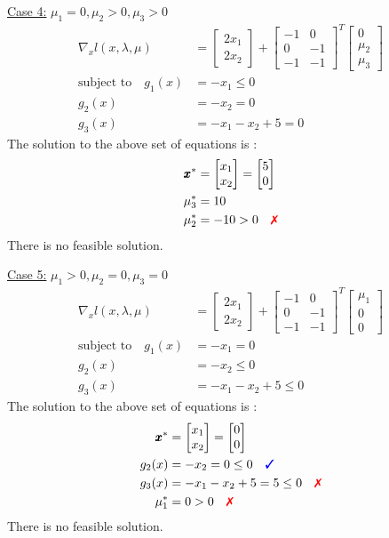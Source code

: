 \documentclass[a4paper,11pt]{article}
\newcommand{\V}[1]{\pmb{#1}}
\newcommand{\mat}[1]{\begin{bmatrix}#1\end{bmatrix}}
\newcommand{\cmark}{{\color{blue}\text{\ding{51}}}}%
\newcommand{\xmark}{{\color{red}\text{\ding{55}}}}%
\begin{document}
\noindent\underline{Case 4:} $\mu_1=0, \mu_2>0, \mu_3>0$
\begin{align*}
 \nabla_x l(x,\lambda,\mu) &= \mat{2x_1\\ 2x_2} +
\mat{-1& 0\\ 0& -1\\-1& -1}^T\mat{0\\ \mu_2\\ \mu_3}\\
% 
 \text{subject to}\quad g_1(x)&=-x_1 \leq 0\\
 g_2(x)&=-x_2 = 0\\
 g_3(x)&= -x_1 -x_2 +5 =0 
\end{align*}
The solution to the above set of equations is :
\begin{align*}
 \V{x}^*&=\mat{x_1\\x_2} = \mat{5\\0}\\
 \mu_3^*&= 10\\
 \mu_2^*&= -10>0 \quad \xmark
\end{align*}
There is no feasible solution.

\noindent\underline{Case 5:} $\mu_1>0, \mu_2=0, \mu_3=0$
\begin{align*}
 \nabla_x l(x,\lambda,\mu) &= \mat{2x_1\\ 2x_2} +
\mat{-1& 0\\ 0& -1\\-1& -1}^T\mat{\mu_1\\ 0\\ 0}\\
% 
 \text{subject to}\quad g_1(x)&=-x_1 = 0\\
 g_2(x)&=-x_2 \leq 0\\
 g_3(x)&= -x_1 -x_2 +5 \leq0 
\end{align*}
The solution to the above set of equations is :
\begin{align*}
 \V{x}^*&=\mat{x_1\\x_2} = \mat{0\\0}\\
 g_2(x)&=-x_2 =0\leq 0 \quad \cmark\\
 g_3(x)&= -x_1 -x_2 +5 = 5 \leq0 \quad \xmark\\
 \mu_1^*&= 0>0 \quad \xmark
\end{align*}
There is no feasible solution.
\end{document}
